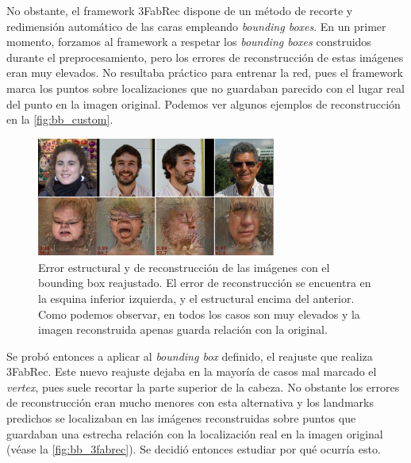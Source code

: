             \medskip

            \noindent No obstante, el framework 3FabRec dispone de un método de recorte y redimensión automático de las caras empleando \textit{bounding boxes}. En un primer momento, forzamos al framework a respetar los \textit{bounding boxes} construidos durante el preprocesamiento, pero los errores de reconstrucción de estas imágenes eran muy elevados. No resultaba práctico para entrenar la red, pues el framework marca los puntos sobre localizaciones que no guardaban parecido con el lugar real del punto en la imagen original. Podemos ver algunos ejemplos de reconstrucción en la \autoref{fig:bb_custom}.


            \begin{figure}[!h]
                \centering
                \includegraphics[width=0.7\textwidth]{img/bounding_box_custom.png}
                \caption{Error estructural y de reconstrucción de las imágenes con el bounding box reajustado. El error de reconstrucción se encuentra en la esquina inferior izquierda, y el estructural encima del anterior. Como podemos observar, en todos los casos son muy elevados y la imagen reconstruida apenas guarda relación con la original.}
                \label{fig:bb_custom}
            \end{figure}

            \medskip

            \noindent Se probó entonces a aplicar al \textit{bounding box} definido, el reajuste que realiza 3FabRec. Este nuevo reajuste dejaba en la mayoría de casos mal marcado el \textit{vertex}, pues suele recortar la parte superior de la cabeza. No obstante los errores de reconstrucción eran mucho menores con esta alternativa y los landmarks predichos se localizaban en las imágenes reconstruidas sobre puntos que guardaban una estrecha relación con la localización real en la imagen original (véase la \autoref{fig:bb_3fabrec}). Se decidió entonces estudiar por qué ocurría esto.


